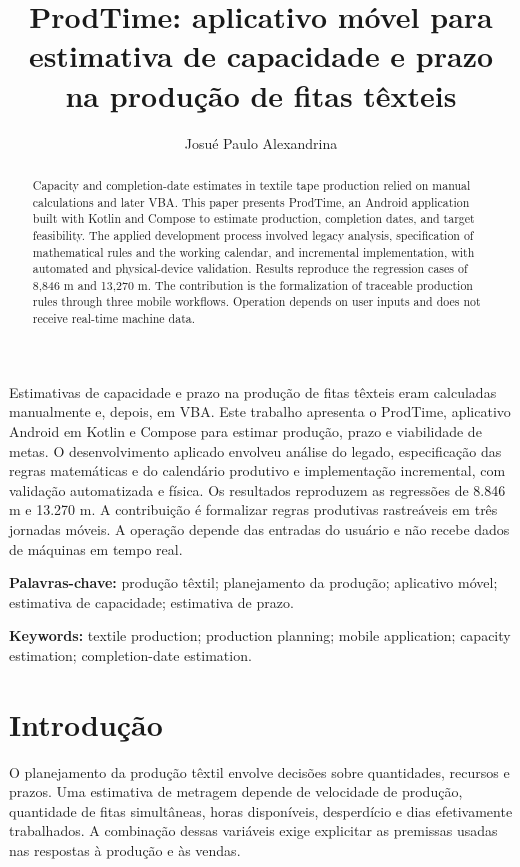 \documentclass[12pt]{article}
\title{ProdTime: aplicativo móvel para estimativa de capacidade e prazo na produção de fitas têxteis}
\author{Josué Paulo Alexandrina\inst{1}}
\begin{document}
\maketitle
\begin{resumo}
Estimativas de capacidade e prazo na produção de fitas têxteis eram calculadas manualmente e, depois, em VBA. Este trabalho apresenta o ProdTime, aplicativo Android em Kotlin e Compose para estimar produção, prazo e viabilidade de metas. O desenvolvimento aplicado envolveu análise do legado, especificação das regras matemáticas e do calendário produtivo e implementação incremental, com validação automatizada e física. Os resultados reproduzem as regressões de 8.846 m e 13.270 m. A contribuição é formalizar regras produtivas rastreáveis em três jornadas móveis. A operação depende das entradas do usuário e não recebe dados de máquinas em tempo real.
\end{resumo}
\textbf{Palavras-chave:} produção têxtil; planejamento da produção; aplicativo móvel; estimativa de capacidade; estimativa de prazo.
\begin{abstract}
Capacity and completion-date estimates in textile tape production relied on manual calculations and later VBA. This paper presents ProdTime, an Android application built with Kotlin and Compose to estimate production, completion dates, and target feasibility. The applied development process involved legacy analysis, specification of mathematical rules and the working calendar, and incremental implementation, with automated and physical-device validation. Results reproduce the regression cases of 8,846 m and 13,270 m. The contribution is the formalization of traceable production rules through three mobile workflows. Operation depends on user inputs and does not receive real-time machine data.
\end{abstract}
\textbf{Keywords:} textile production; production planning; mobile application; capacity estimation; completion-date estimation.

\section{Introdução}\label{introduuxe7uxe3o}

O planejamento da produção têxtil envolve decisões sobre quantidades, recursos e prazos. Uma estimativa de metragem depende de velocidade de produção, quantidade de fitas simultâneas, horas disponíveis, desperdício e dias efetivamente trabalhados. A combinação dessas variáveis exige explicitar as premissas usadas nas respostas à produção e às vendas.
\end{document}
